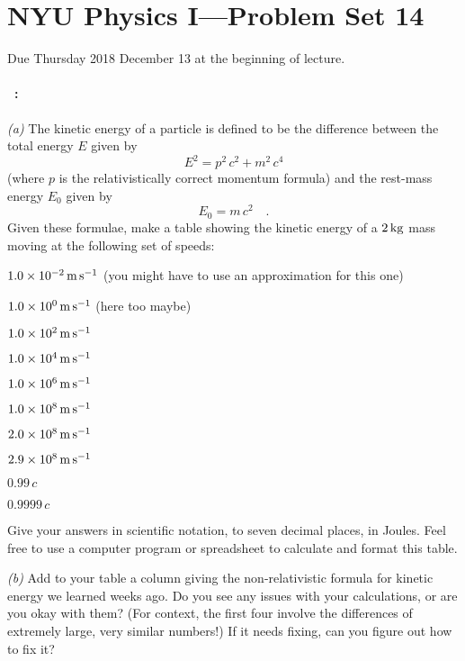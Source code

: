 \documentclass[12pt]{article}
\begin{document}
\section*{NYU Physics I---Problem Set 14}

Due Thursday 2018 December 13 at the beginning of lecture.

\paragraph{\problemname~\theproblem:}%
\textsl{(a)} The kinetic energy of a particle is defined to be the difference between the
total energy $E$ given by
\begin{equation}
E^2 = p^2\,c^2 + m^2\,c^4
\end{equation}
(where $p$ is the relativistically correct momentum formula) and the
rest-mass energy $E_0$ given by
\begin{equation}
E_0 = m\,c^2 \quad.
\end{equation}
Given these formulae, make a table showing the kinetic energy of a $2\,\mathrm{kg}$ mass
moving at the following set of speeds:
\begin{trivlist}
\item $1.0\times10^{-2}\,\mathrm{m}\,\mathrm{s}^{-1}$ (you might have to use an approximation for this one)
\item $1.0\times10^0\,\mathrm{m}\,\mathrm{s}^{-1}$ (here too maybe)
\item $1.0\times10^2\,\mathrm{m}\,\mathrm{s}^{-1}$
\item $1.0\times10^4\,\mathrm{m}\,\mathrm{s}^{-1}$
\item $1.0\times10^6\,\mathrm{m}\,\mathrm{s}^{-1}$
\item $1.0\times10^8\,\mathrm{m}\,\mathrm{s}^{-1}$
\item $2.0\times10^8\,\mathrm{m}\,\mathrm{s}^{-1}$
\item $2.9\times10^8\,\mathrm{m}\,\mathrm{s}^{-1}$
\item $0.99\,c$
\item $0.9999\,c$
\end{trivlist}
Give your answers in scientific notation, to seven decimal places, in Joules. Feel free to use
a computer program or spreadsheet to calculate and format this table.

\textsl{(b)} Add to your table a column giving the non-relativistic
formula for kinetic energy we learned weeks ago. Do you see any issues
with your calculations, or are you okay with them? (For context, the
first four involve the differences of extremely large, very similar
numbers!) If it needs fixing, can you figure out how to fix it?
\end{document}
